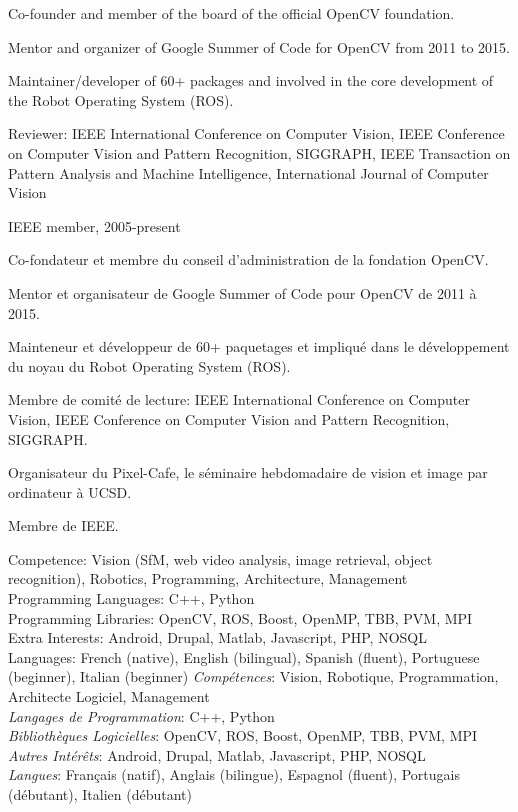 \documentclass{article}
\begin{document}
\begin{llist}
{Co-founder and member of the board of the official OpenCV foundation.

Mentor and organizer of Google Summer of Code for OpenCV from 2011 to 2015.

Maintainer/developer of 60+ packages and involved in the core development of the Robot Operating System (ROS).

Reviewer: IEEE International Conference on Computer Vision, IEEE Conference on Computer Vision and Pattern Recognition, 
SIGGRAPH, IEEE Transaction on Pattern Analysis and Machine Intelligence, International Journal of Computer Vision

IEEE member, 2005-present
}
{

Co-fondateur et membre du conseil d'administration de la fondation OpenCV.

Mentor et organisateur de Google Summer of Code pour OpenCV de 2011 \`{a} 2015.

Mainteneur et d\'{e}veloppeur de 60+ paquetages et impliqu\'{e} dans le d\'{e}veloppement du
noyau du Robot Operating System (ROS).

Membre de comit\'{e} de lecture: IEEE International Conference on Computer Vision, IEEE Conference on Computer Vision 
and Pattern Recognition, SIGGRAPH.

Organisateur du Pixel-Cafe, le s\'{e}minaire hebdomadaire de vision et image par ordinateur \`{a} UCSD.

Membre de IEEE.
}

{
Competence: Vision (SfM, web video analysis, image retrieval, object recognition), Robotics, Programming, Architecture, 
Management \\
Programming Languages: C++, Python\\
Programming Libraries: OpenCV, ROS, Boost, OpenMP, TBB, PVM, MPI \\
Extra Interests: Android, Drupal, Matlab, Javascript, PHP, NOSQL \\
Languages: French (native), English (bilingual), Spanish (fluent), Portuguese (beginner), Italian (beginner)
}
{
{\em Comp\'{e}tences}: Vision, Robotique, Programmation, Architecte Logiciel, Management\\
{\em Langages de Programmation}: C++, Python\\
{\em Biblioth\`{e}ques Logicielles}: OpenCV, ROS, Boost, OpenMP, TBB, PVM, MPI \\
{\em Autres Int\'{e}r\^{e}ts}: Android, Drupal, Matlab, Javascript, PHP, NOSQL \\
{\em Langues}: Fran\c{c}ais (natif), Anglais (bilingue), Espagnol (fluent), Portugais (d\'{e}butant), Italien
(d\'{e}butant)
}


\end{llist}
\end{document}
